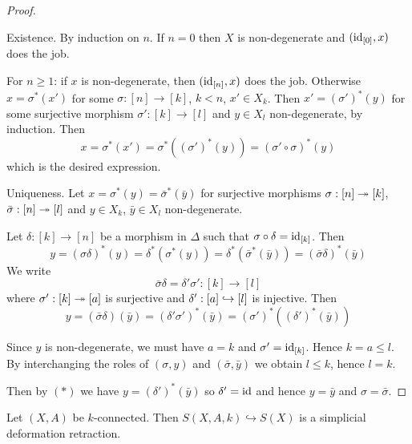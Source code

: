 \begin{proof}\ 

Existence. By induction on $n$. If $n=0$ then $X$ is non-degenerate and $(\operatorname{id}_{[0]},x)$ does the job.

For $n\geq1$: if $x$ is non-degenerate, then $(\operatorname{id}_{[n]},x)$ does the job.
Otherwise $x=\sigma^*(x')$ for some $\sigma:[n]\to [k]$, $k<n$, $x'\in X_k$.
Then $x'=(\sigma')^*(y)$ for some surjective morphism $\sigma':[k]\to[l]$ and $y\in X_l$ non-degenerate, by induction. Then \[x=\sigma^*(x')=\sigma^*((\sigma')^*(y))=(\sigma'\circ\sigma)^*(y)\] which is the desired expression.

Uniqueness. Let $x=\sigma^*(y)=\bar{\sigma}^*(\bar y)$ for surjective morphisms $\sigma:[n]\twoheadrightarrow[k]$, $\bar{\sigma}:[n]\twoheadrightarrow[l]$ and $y\in X_k$, $\bar y \in X_l$ non-degenerate.

Let $\delta:[k]\to[n]$ be a morphism in $\Delta$ such that $\sigma\circ\delta=\operatorname{id}_{[k]}$.
Then
\[y=(\sigma\delta)^*(y)=\delta^*(\sigma^*(y))=\delta^*(\bar{\sigma}^*(\bar{y}))=(\bar{\sigma}\delta)^*(\bar{y})\]
We write
\[\bar{\sigma}\delta=\delta'\sigma': [k]\to[l]\]
where $\sigma':[k]\twoheadrightarrow[a]$ is surjective and $\delta':[a]\hookrightarrow[l]$ is injective. Then \[y=(\bar\sigma\delta)(\bar y)=(\delta'\sigma')^*(\bar y)=(\sigma')^*((\delta')^*(\bar{y}))\tag{$*$}\]

Since $y$ is non-degenerate, we must have $a=k$ and $\sigma'=\operatorname{id}_{[k]}$. Hence $k=a\leq l$. By interchanging the roles of $(\sigma,y)$ and $(\bar{\sigma},\bar{y})$ we obtain $l\leq k$, hence $l=k$.

Then by $(*)$ we have $y=(\delta')^*(\bar{y})$ so $\delta'=\operatorname{id}$ and hence $y=\bar{y}$ and $\sigma=\bar{\sigma}$.
\end{proof}

\begin{theorem}
Let $(X,A)$ be $k$-connected. Then $S(X,A,k)\hookrightarrow S(X)$ is a simplicial deformation retraction.
\end{theorem}

